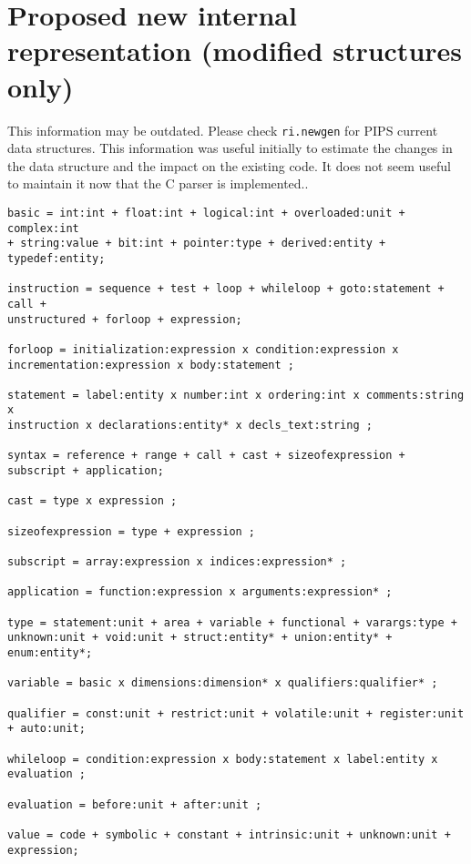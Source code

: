 \documentclass[a4paper]{report}
\begin{document}
\chapter{Proposed new internal representation (modified structures only)}

This information may be outdated. Please check \verb/ri.newgen/ for
PIPS current data structures. This information was useful initially to
estimate the changes in the data structure and the impact on the
existing code. It does not seem useful to maintain it now that the C
parser is implemented..

\begin{verbatim}
basic = int:int + float:int + logical:int + overloaded:unit + complex:int 
+ string:value + bit:int + pointer:type + derived:entity + typedef:entity;

instruction = sequence + test + loop + whileloop + goto:statement + call +
unstructured + forloop + expression;

forloop = initialization:expression x condition:expression x
incrementation:expression x body:statement ;

statement = label:entity x number:int x ordering:int x comments:string x
instruction x declarations:entity* x decls_text:string ;

syntax = reference + range + call + cast + sizeofexpression + subscript + application;

cast = type x expression ;

sizeofexpression = type + expression ;

subscript = array:expression x indices:expression* ;

application = function:expression x arguments:expression* ;

type = statement:unit + area + variable + functional + varargs:type +
unknown:unit + void:unit + struct:entity* + union:entity* + enum:entity*;

variable = basic x dimensions:dimension* x qualifiers:qualifier* ;

qualifier = const:unit + restrict:unit + volatile:unit + register:unit + auto:unit;

whileloop = condition:expression x body:statement x label:entity x
evaluation ;

evaluation = before:unit + after:unit ;

value = code + symbolic + constant + intrinsic:unit + unknown:unit + expression;
\end{verbatim}



\end{document}
